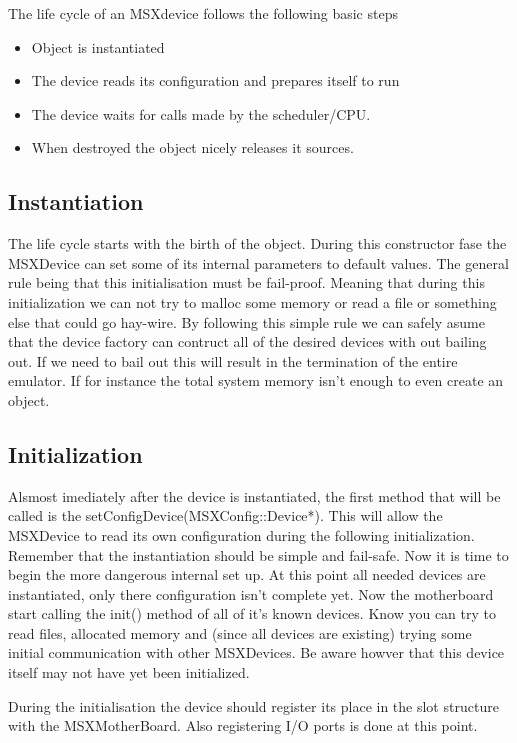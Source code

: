 \documentclass[11pt, a4paper]{report}
\begin{document}
The life cycle of an MSXdevice follows the following basic steps
\begin{itemize}
\item Object is instantiated
\item The device reads its configuration and prepares itself to run
\item The device waits for calls made by the scheduler/CPU.
\item When destroyed the object nicely releases it sources.
\end{itemize}

\subsection{Instantiation}
The life cycle starts with the birth of the object.
During this constructor fase the MSXDevice can set some of its internal parameters to default values. The general rule being that this initialisation must be fail-proof. Meaning that during this initialization we can not try to malloc some memory or read a file or something else that could go hay-wire. By following this simple rule we can safely asume that the device factory can contruct all of the desired devices with out bailing out.
If we need to bail out this will result in the termination of the entire emulator. If for instance the total system memory isn't enough to even create an object.

\subsection{Initialization}
Alsmost imediately after the device is instantiated, the first method that will be called is the setConfigDevice(MSXConfig::Device*). This will allow the MSXDevice to read its own configuration during the following initialization. Remember that the instantiation should be simple and fail-safe. Now it is time to begin the more dangerous internal set up. At this point all needed devices are instantiated, only there configuration isn't complete yet. Now the motherboard start calling the init() method of all of it's known devices. 
Know you can try to read files, allocated memory and (since all devices are existing) trying some initial communication with other MSXDevices. Be aware howver that this device itself may not have yet been initialized.

During the initialisation the device should register its place in the slot structure with the MSXMotherBoard. Also registering I/O ports is done at this point.
\end{document}
